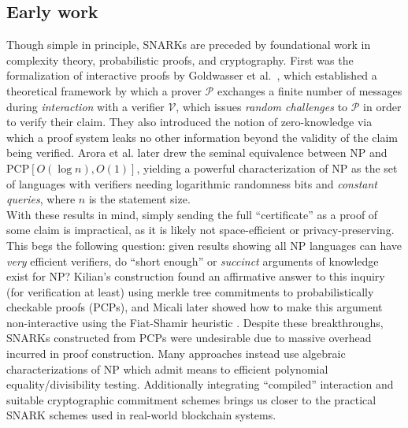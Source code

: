 \subsection{Early work}
\noindent Though simple in principle, SNARKs are preceded by foundational work in complexity theory, probabilistic proofs, and cryptography. First was the formalization of interactive proofs by Goldwasser et al.\ \cite{ipfirst}, which established a theoretical framework by which a prover $\mathcal{P}$ exchanges a finite number of messages during \textit{interaction} with a verifier $\mathcal{V}$, which issues \textit{random challenges} to $\mathcal{P}$ in order to verify their claim. They also introduced the notion of zero-knowledge via which a proof system leaks no other information beyond the validity of the claim being verified. Arora et al. \cite{pcpthm1, pcpthm2} later drew the seminal equivalence between NP and PCP$[O(\log n), O(1)]$, yielding a powerful characterization of NP as the set of languages with verifiers needing logarithmic randomness bits and \textit{constant queries}, where $n$ is the statement size.\\

\noindent With these results in mind, simply sending the full ``certificate'' as a proof of some claim is impractical, as it is likely not space-efficient or privacy-preserving. This begs the following question: given results showing all NP languages can have \textit{very} efficient verifiers, do ``short enough'' or \textit{succinct} arguments of knowledge exist for NP? Kilian's construction \cite{kilian} found an affirmative answer to this inquiry (for verification at least) using merkle tree commitments to probabilistically checkable proofs (PCPs), and Micali later showed how to make this argument non-interactive \cite{micalisnark} using the Fiat-Shamir heuristic \cite{fiatshamir}. Despite these breakthroughs, SNARKs constructed from PCPs were undesirable due to massive overhead incurred in proof construction. Many approaches instead use algebraic characterizations of NP which admit means to efficient polynomial equality/divisibility testing. Additionally integrating ``compiled'' interaction and suitable cryptographic commitment schemes brings us closer to the practical SNARK schemes used in real-world blockchain systems.\\

